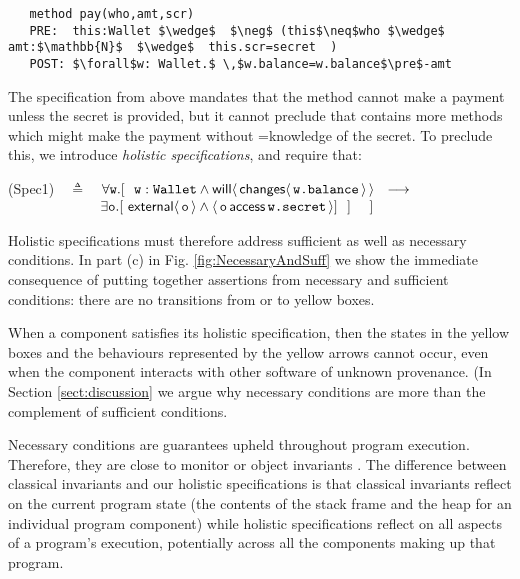 \documentclass[acmsmall,screen]{acmart}
\begin{document}
\begin{lstlisting}
   method pay(who,amt,scr)
   PRE:  this:Wallet $\wedge$  $\neg$ (this$\neq$who $\wedge$ amt:$\mathbb{N}$  $\wedge$  this.scr=secret  )
   POST: $\forall$w: Wallet.$ \,$w.balance=w.balance$\pre$-amt 
 \end{lstlisting}
\vspace{-.2in}
The specification from above mandates that the method  cannot make a payment unless the secret is
provided, but it cannot preclude that  contains more methods which might make the payment without =knowledge of the
secret. To preclude this, we introduce \emph{holistic specifications}, and require that:


(Spec1)\ \  $\triangleq$\ \ $\forall \prg{w}.[\ \ \prg{w}:\prg{Wallet} \wedge \Future{\Changes{\prg{w.balance}}} \ \    
    \longrightarrow \ \    \hfill$ \\
  $\strut \hspace{2.3cm} 
  \exists \prg{o}. [\  \External{\prg{o}} \wedge  \CanAccess{\prg{o}}{\prg{w.secret}}]  \  \ ] \ \ \ \ ] \hfill $



 
 
 
%
Holistic specifications must therefore address sufficient as well as necessary conditions.
In   part (c)    in Fig. \ref{fig:NecessaryAndSuff} we show the 
immediate consequence of putting together assertions from necessary and sufficient conditions: 
there are no transitions from or to yellow boxes.

When a component satisfies its holistic specification,
then the states  in the yellow boxes and the 
behaviours
represented  by the yellow arrows cannot occur, even when the
component interacts with other software of unknown provenance.
(In Section \ref{sect:discussion} we argue why necessary conditions are more than the complement of
sufficient conditions.

 
Necessary conditions are guarantees upheld throughout program execution.
Therefore, they are close to monitor or object
invariants \cite{Hoare74,Meyer97}. The difference between 
classical invariants and our holistic specifications is that classical invariants  reflect  on
the current program state (\ie the contents of the
stack frame and the heap for an individual program component) while
holistic specifications reflect on all aspects of a program's
execution, potentially across all the components making up that program.
\end{document}
